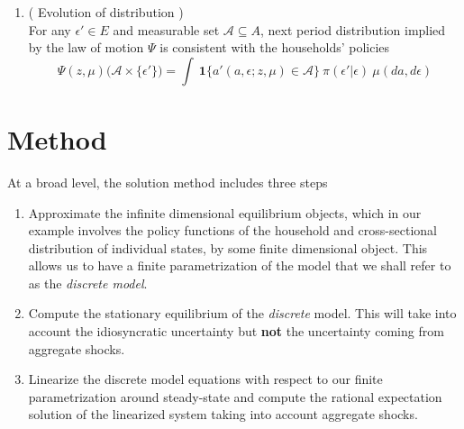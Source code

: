\documentclass[a4paper,10pt]{article}  %
\begin{document}
\begin{enumerate}
   \item ( Evolution of distribution ) \\
         For any $ \epsilon' \in E $ and measurable set $ \mathcal{A} \subseteq A $, next period distribution implied by the
         law of motion $ \Psi $ is consistent with the households' policies
         \begin{equation}
            \label{eq:law_of_motion}
            \Psi( z, \mu ) \Big( \mathcal{A} \times \{\epsilon'\} \Big) = \int
            \ \mathbf{1} \Big\{  a'( a, \epsilon; z, \mu ) \in \mathcal{A} \Big\} \ \pi( \epsilon' | \epsilon ) \ \mu( da, d \epsilon )
         \end{equation}
\end{enumerate}


\newpage
\section{Method} %
\label{sec:method}

At a broad level, the solution method includes three steps
\begin{enumerate}
   \item Approximate the infinite dimensional equilibrium objects, which in our example involves the
         policy functions of the household and cross-sectional distribution of individual states, by some
         finite dimensional object. This allows us to have a finite parametrization of the model that we
         shall refer to as the \emph{discrete model}.

   \item Compute the stationary equilibrium of the \emph{discrete} model. This will take into account
         the idiosyncratic uncertainty but \textbf{not} the uncertainty coming from aggregate shocks.

   \item Linearize the discrete model equations with respect to our finite parametrization around
         steady-state and compute the rational expectation solution of the linearized system taking into
         account aggregate shocks.
\end{enumerate}
\end{document}
